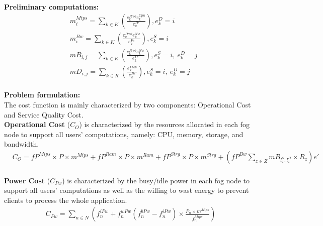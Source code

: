 \documentclass{article}
\begin{document}
\pagebreak

\noindent\textbf{Preliminary computations:}\\[6pt]
\begin{equation*}
\begin{split}
& m^{Mips}_{i} = \sum_{k\in K} \left(\frac{e^{Prob}_k e^{Cpu}_k}{e^{Pe}_k}\right), e_k^{D} = i\\[6pt]
& m^{Bw}_{i} = \sum_{k\in K} \left(\frac{e^{Prob}_k e^{Nw}_k}{e^{Pe}_k}\right), e^{S}_k = i\\[6pt]
& mB_{i,j}= \sum_{k\in K} \left(\frac{e^{Prob}_k e^{Nw}_k}{e^{Pe}_k}\right), e^{S}_k = i,~e^{D}_k = j\\[6pt]
& mD_{i,j}= \sum_{k\in K} \left(\frac{e^{Prob}_k}{e^{Pe}_k}\right), e^{S}_k = i,~e^{D}_k = j
\end{split}
\end{equation*}\\[6pt]

\noindent\textbf{Problem formulation:}\\[6pt]
The cost function is mainly characterized by two components: Operational Cost and Service Quality Cost.\\[6pt]

\noindent\textbf{Operational Cost} ($C_O$) is characterized by the resources allocated in each fog node to support all users' computations, namely: CPU, memory, storage, and bandwidth.\\[6pt]

\begin{equation*}
\begin{split}
	& C_O = fP^{Mips} \times P \times m^{Mips} + fP^{Ram} \times P \times m^{Ram} + fP^{Strg}\times P\times m^{Strg} + \left(fP^{Bw} \sum_{z\in Z} mB_{l^S_z,l^D_z} \times R_z\right)e'
\end{split}
\end{equation*}\\[6pt]

\noindent\textbf{Power Cost} ($C_{Pw}$) is characterized by the busy/idle power in each fog node to support all users' computations as well as the willing to wast energy to prevent clients to process the whole application.\\[6pt]
\begin{equation*}
\begin{aligned}
C_{Pw} = \sum_{n\in N}\left(f_n^{iPw} + f_n^{wPw} (f_n^{bPw} - f_n^{iPw}) \times\frac{P_n \times m^{Mips}}{f_n^{Mips}}\right)
\end{aligned}
\end{equation*}\\[6pt]
\end{document}
